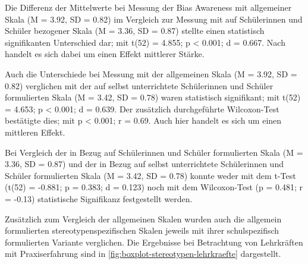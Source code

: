 Die Differenz der Mittelwerte bei Messung der Bias Awareness mit allgemeiner Skala (M = 3.92, SD = 0.82) im Vergleich zur Messung mit auf Schülerinnen und Schüler bezogener Skala (M = 3.36, SD = 0.87) stellte einen statistisch signifikanten Unterschied dar; mit t(52) = 4.855; p < 0.001; d = 0.667.
Nach \citet{cohen1992power} handelt es sich dabei um einen Effekt mittlerer Stärke.

Auch die Unterschiede bei Messung mit der allgemeinen Skala (M = 3.92, SD = 0.82) verglichen mit der auf selbst unterrichtete Schülerinnen und Schüler formulierten Skala (M = 3.42, SD = 0.78) waren statistisch signifikant; mit t(52) = 4.653; p < 0.001; d = 0.639.
Der zusätzlich durchgeführte Wilcoxon-Test bestätigte dies; mit p < 0.001; r = 0.69.
Auch hier handelt es sich um einen mittleren Effekt.

Bei Vergleich der in Bezug auf Schülerinnen und Schüler formulierten Skala (M = 3.36, SD = 0.87) und der in Bezug auf selbst unterrichtete Schülerinnen und Schüler formulierten Skala (M = 3.42, SD = 0.78) konnte weder mit dem t-Test (t(52) = -0.881; p = 0.383; d = 0.123) noch mit dem Wilcoxon-Test (p = 0.481; r = -0.13) statistische Signifikanz festgestellt werden.

Zusätzlich zum Vergleich der allgemeinen Skalen wurden auch die allgemein formulierten stereotypenspezifischen Skalen jeweils mit ihrer schulspezifisch formulierten Variante verglichen.
Die Ergebnisse bei Betrachtung von Lehrkräften mit Praxiserfahrung sind in \autoref{fig:boxplot-stereotypen-lehrkraefte} dargestellt.

